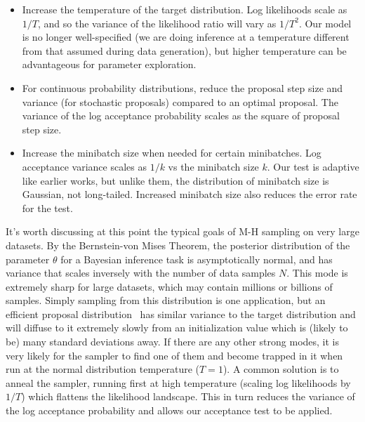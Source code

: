 \documentclass{article}
\begin{document}
\begin{itemize}
  
\item Increase the temperature of the target distribution. Log likelihoods
  scale as $1/T$, and so the variance of the likelihood ratio will
  vary as $1/T^2$. Our model is no longer well-specified (we are doing inference
  at a temperature different from that assumed during data generation), but
  higher temperature can be advantageous for parameter exploration.

\item For continuous probability distributions, reduce the proposal
  step size and variance (for stochastic proposals) compared to an optimal
  proposal. The variance of the log acceptance probability scales as the
  square of proposal step size. 

\item Increase the minibatch size when needed for certain
  minibatches. Log acceptance variance scales as $1/k$ vs the
  minibatch size $k$. Our test is adaptive like earlier works, but
  unlike them, the distribution of minibatch size is Gaussian, not
  long-tailed.  Increased minibatch size also reduces the error rate
  for the test.

\end{itemize}

It's worth discussing at this point the typical goals of
M-H sampling on very large datasets.  By the Bernstein-von Mises
Theorem, the posterior distribution of the parameter $\theta$ for a
Bayesian inference task is asymptotically normal, and has variance
that scales inversely with the number of data samples $N$. This mode
is extremely sharp for large datasets, which may contain millions or
billions of samples. Simply sampling from this distribution is one
application, but an efficient proposal distribution~\cite{OptimalScaling01} has similar variance to the target
distribution and will diffuse to it extremely slowly from an
initialization value which is (likely to be) many standard deviations
away. If there are any other strong modes, it is very likely for the
sampler to find one of them and become trapped in it when run at the
normal distribution temperature ($T=1$). A common solution is to anneal
the sampler, running first at high temperature (scaling log
likelihoods by $1/T$) which flattens the likelihood landscape.  This in
turn reduces the variance of the log acceptance probability and allows
our acceptance test to be applied.
\end{document}
